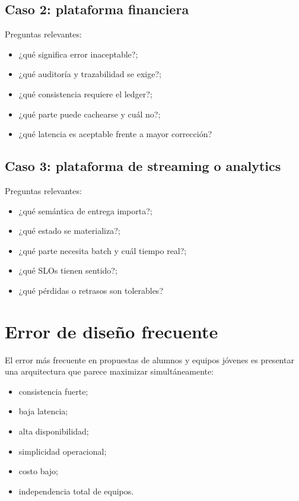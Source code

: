 \documentclass[variant=apuntes,cover=institutional,mode=screen]{ua-engineering-v6-article}
\begin{document}
\subsection{Caso 2: plataforma financiera}

Preguntas relevantes:
\begin{itemize}
\item ¿qué significa error inaceptable?;
\item ¿qué auditoría y trazabilidad se exige?;
\item ¿qué consistencia requiere el ledger?;
\item ¿qué parte puede cachearse y cuál no?;
\item ¿qué latencia es aceptable frente a mayor corrección?
\end{itemize}

\subsection{Caso 3: plataforma de streaming o analytics}

Preguntas relevantes:
\begin{itemize}
\item ¿qué semántica de entrega importa?;
\item ¿qué estado se materializa?;
\item ¿qué parte necesita batch y cuál tiempo real?;
\item ¿qué SLOs tienen sentido?;
\item ¿qué pérdidas o retrasos son tolerables?
\end{itemize}

\section{Error de diseño frecuente}

El error más frecuente en propuestas de alumnos y equipos jóvenes es presentar una arquitectura que parece maximizar simultáneamente:
\begin{itemize}
\item consistencia fuerte;
\item baja latencia;
\item alta disponibilidad;
\item simplicidad operacional;
\item costo bajo;
\item independencia total de equipos.
\end{itemize}
\end{document}
